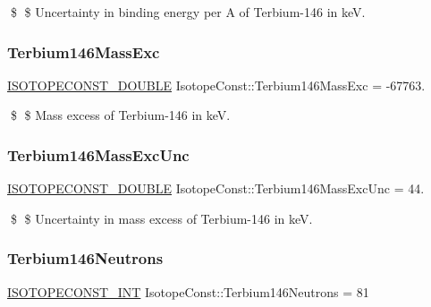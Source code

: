\$ \$ Uncertainty in binding energy per A of Terbium-\/146 in keV. \mbox{\label{group___isotope_const-_terbium-_tb146_gaafed1169eeed8722476c3086c5220f71}} 
\subsubsection{\texorpdfstring{Terbium146\+Mass\+Exc}{Terbium146MassExc}}
{\footnotesize\ttfamily \mbox{\hyperlink{group___isotope_const-_macros_ga8f45a7272ce02c0b4c65c44636ed719a}{I\+S\+O\+T\+O\+P\+E\+C\+O\+N\+S\+T\+\_\+\+D\+O\+U\+B\+LE}} Isotope\+Const\+::\+Terbium146\+Mass\+Exc = -\/67763.}

\$ \$ Mass excess of Terbium-\/146 in keV. \mbox{\label{group___isotope_const-_terbium-_tb146_gae719823a8f6f49c35f1b0abe688d7db4}} 
\subsubsection{\texorpdfstring{Terbium146\+Mass\+Exc\+Unc}{Terbium146MassExcUnc}}
{\footnotesize\ttfamily \mbox{\hyperlink{group___isotope_const-_macros_ga8f45a7272ce02c0b4c65c44636ed719a}{I\+S\+O\+T\+O\+P\+E\+C\+O\+N\+S\+T\+\_\+\+D\+O\+U\+B\+LE}} Isotope\+Const\+::\+Terbium146\+Mass\+Exc\+Unc = 44.}

\$ \$ Uncertainty in mass excess of Terbium-\/146 in keV. \mbox{\label{group___isotope_const-_terbium-_tb146_gaf53614721eeae856d7c1672ee1fe7197}} 
\subsubsection{\texorpdfstring{Terbium146\+Neutrons}{Terbium146Neutrons}}
{\footnotesize\ttfamily \mbox{\hyperlink{group___isotope_const-_macros_ga5f18360b3e99483a35c32d789e62621c}{I\+S\+O\+T\+O\+P\+E\+C\+O\+N\+S\+T\+\_\+\+I\+NT}} Isotope\+Const\+::\+Terbium146\+Neutrons = 81}

